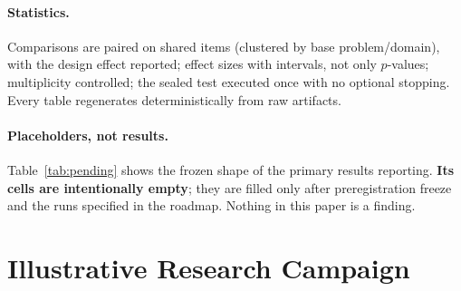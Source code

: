\documentclass[11pt]{article}
\theoremstyle{definition}
\theoremstyle{remark}
\newcommand{\pfbench}{ParadigmForgeBench}
\begin{document}
\paragraph{Statistics.} Comparisons are paired on shared items (clustered by base problem/domain),
with the design effect reported; effect sizes with intervals, not only $p$-values; multiplicity
controlled; the sealed test executed once with no optional stopping. Every table regenerates
deterministically from raw artifacts.

\paragraph{Placeholders, not results.} Table~\ref{tab:pending} shows the frozen shape of the primary
results reporting. \textbf{Its cells are intentionally empty}; they are filled only after
preregistration freeze and the runs specified in the roadmap. Nothing in this paper is a finding.

\begin{table}[t]
\centering
\small
\caption{\textbf{[PENDING --- no experiment run]} Frozen shape of the primary \pfbench{} results.
Cells are filled only after preregistration freeze; this is a reporting template, not data.}
\label{tab:pending}
\end{table}

\section{Illustrative Research Campaign}
\label{sec:case}
\end{document}
